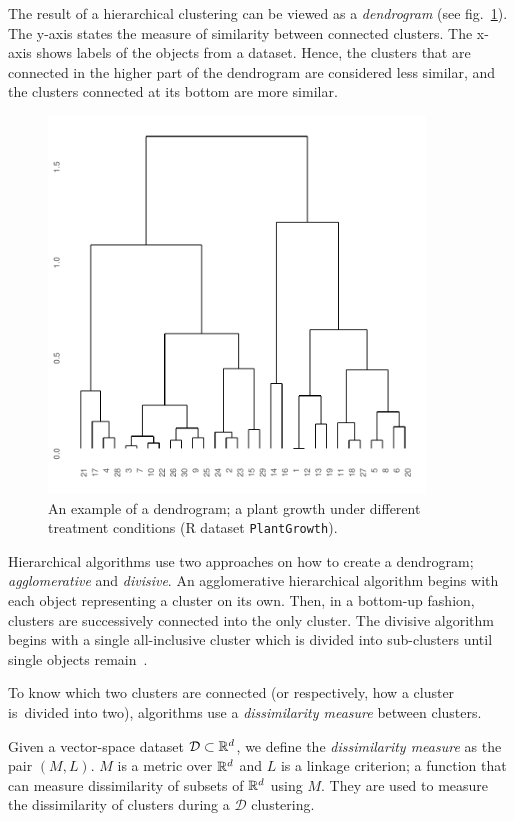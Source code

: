 The result of a hierarchical clustering can be viewed as a \emph{dendrogram} (see fig.~\ref{fig01:dendro}). The y-axis states the measure of similarity between connected clusters. The x-axis shows labels of the objects from a dataset. Hence, the clusters that are connected in the higher part of the dendrogram are considered less similar, and the clusters connected at its bottom are more similar. 

\begin{figure}[t]
	\centering
	\includegraphics[width=10cm]{img/dendro}
	\caption{An example of a dendrogram; a plant growth under different treatment conditions (R dataset \texttt{PlantGrowth}).}
	\label{fig01:dendro}
\end{figure}

Hierarchical algorithms use two approaches on how to create a dendrogram; \emph{agglomerative} and \emph{divisive}. An agglomerative hierarchical algorithm begins with each object representing a cluster on its own. Then, in a bottom-up fashion, clusters are successively connected into the only cluster. The divisive algorithm begins with a single all-inclusive cluster which is divided into sub-clusters until single objects remain~\cite{rokach2005clustering}. 



To know which two clusters are connected (or respectively, how a cluster is~divided into two), algorithms use a \emph{dissimilarity measure} between clusters.  

\begin{defn}
	Given a vector-space dataset $\mathcal{D}\subset\mathbb{R}^d$,  we define the \emph{dissimilarity measure} as the pair $(M,L)$. $M$ is a metric over $\mathbb{R}^d$ and $L$ is a linkage criterion; a function that can measure dissimilarity of subsets of $\mathbb{R}^d$ using $M$. They are used to measure the dissimilarity of clusters during a $\mathcal{D}$ clustering.
\end{defn}

